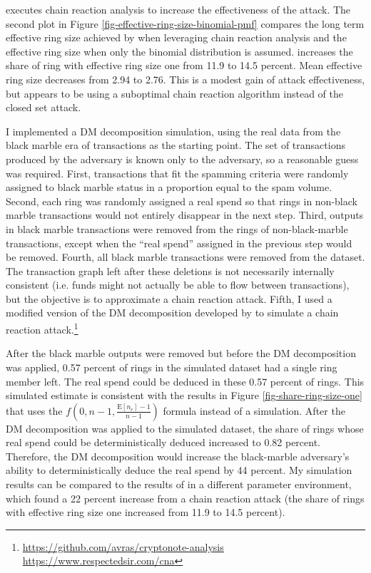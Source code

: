 \documentclass[usletter,11pt,english,openany]{article}
\begin{document}
\cite{Chervinski2021} executes chain reaction analysis to increase
the effectiveness of the attack. The second plot in Figure \ref{fig-effective-ring-size-binomial-pmf}
compares the long term effective ring size achieved by \cite{Chervinski2021}
when leveraging chain reaction analysis and the effective ring size
when only the binomial distribution is assumed. \cite{Chervinski2021}
increases the share of ring with effective ring size one from 11.9
to 14.5 percent. Mean effective ring size decreases from 2.94 to 2.76.
This is a modest gain of attack effectiveness, but \cite{Chervinski2021}
appears to be using a suboptimal chain reaction algorithm instead
of the closed set attack.

I implemented a DM decomposition simulation, using the real data from
the black marble era of transactions as the starting point. The set
of transactions produced by the adversary is known only to the adversary,
so a reasonable guess was required. First, transactions that fit the
spamming criteria were randomly assigned to black marble status in
a proportion equal to the spam volume. Second, each ring was randomly
assigned a real spend so that rings in non-black marble transactions
would not entirely disappear in the next step. Third, outputs in black
marble transactions were removed from the rings of non-black-marble
transactions, except when the ``real spend'' assigned in the previous
step would be removed. Fourth, all black marble transactions were
removed from the dataset. The transaction graph left after these deletions
is not necessarily internally consistent (i.e. funds might not actually
be able to flow between transactions), but the objective is to approximate
a chain reaction attack. Fifth, I used a modified version of the DM
decomposition developed by \cite{Vijayakumaran2023} to simulate a
chain reaction attack.\footnote{\url{https://github.com/avras/cryptonote-analysis}\\
\url{https://www.respectedsir.com/cna}}

After the black marble outputs were removed but before the DM decomposition
was applied, 0.57 percent of rings in the simulated dataset had a
single ring member left. The real spend could be deduced in these
0.57 percent of rings. This simulated estimate is consistent with
the results in Figure \ref{fig-share-ring-size-one} that uses the
$f\left(0,n-1,\frac{\mathrm{E}\left[n_{e}\right]-1}{n-1}\right)$
formula instead of a simulation. After the DM decomposition was applied
to the simulated dataset, the share of rings whose real spend could
be deterministically deduced increased to 0.82 percent. Therefore,
the DM decomposition would increase the black-marble adversary's ability
to deterministically deduce the real spend by 44 percent. My simulation
results can be compared to the results of \cite{Chervinski2021} in
a different parameter environment, which found a 22 percent increase
from a chain reaction attack (the share of rings with effective ring
size one increased from 11.9 to 14.5 percent).
\end{document}
